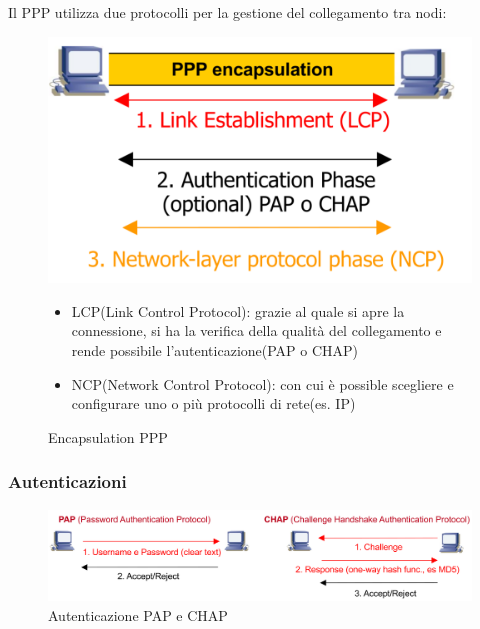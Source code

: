     Il PPP utilizza due protocolli per la gestione del collegamento tra nodi:
    
    \begin{figure}[htbp]
        \centering
        \begin{minipage}{0.45\textwidth}
            \includegraphics[width=\linewidth]{images/pppencapsulation.png}
            \caption{Encapsulation PPP}
            \label{fig:ppp-encapsulation}
        \end{minipage}%
        \hfill
        \begin{minipage}{0.5\textwidth}
            \begin{itemize}
                \item LCP(Link Control Protocol): grazie al quale si apre la connessione, si ha la verifica della qualità del collegamento e rende possibile l'autenticazione(PAP o CHAP)
                \item NCP(Network Control Protocol): con cui è possible scegliere e configurare uno o più protocolli di rete(es. IP)
            \end{itemize} 

        \end{minipage}
    \end{figure}
\newpage
    \subsubsection{Autenticazioni}
    \begin{figure}[htbp]
        \centering
        \includegraphics[width=1\textwidth]{images/autenticazionecapchap.png}
        \caption{Autenticazione PAP e CHAP}
        \label{fig:autenticazione-pap-chap}
    \end{figure}
